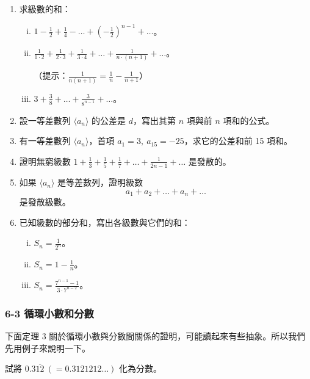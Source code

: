 \begin{enumerate}
    \item 求級數的和：
    \begin{enumerate}[(i)]
        \item $1 - \frac{1}{2} + \frac{1}{4} - \dots + (-\frac{1}{2})^{n-1} + \dots$。
        \item $\frac{1}{1\cdot 2} + \frac{1}{2\cdot 3} + \frac{1}{3\cdot 4} + \dots + \frac{1}{n\cdot(n+1)} + \dots$。
        
        （提示：$\frac{1}{n(n+1)} = \frac{1}{n} - \frac{1}{n+1}$）
        \item $3 + \frac{3}{8} + \dots + \frac{3}{8^{n-1}} + \dots$。
    \end{enumerate}

    \item 設一等差數列 $\langle a_n \rangle$ 的公差是 $d$，寫出其第 $n$ 項與前 $n$ 項和的公式。

    \item 有一等差數列 $\langle a_n \rangle$，首項 $a_1=3,\ a_{15}=-25$，求它的公差和前 15 項和。

    \item 證明無窮級數 $1 + \frac{1}{3} + \frac{1}{5} + \frac{1}{7} + \dots + \frac{1}{2n-1} + \dots$ 是發散的。

    \item 如果 $\langle a_n \rangle$ 是等差數列，證明級數
    \[
    a_1+a_2+\dots+a_n+\dots
    \]
    是發散級數。

    \item 已知級數的部分和，寫出各級數與它們的和：
    \begin{enumerate}[(i)]
        \item $S_n = \frac{1}{2^n}$。
        \item $S_n = 1 - \frac{1}{n}$。
        \item $S_n = \frac{7^{n-1}-1}{3\cdot 7^{n-2}}$。
    \end{enumerate}
\end{enumerate}

\subsubsection*{6-3 循環小數和分數}

下面定理 3 關於循環小數與分數間關係的證明，可能讀起來有些抽象。所以我們先用例子來說明一下。

\begin{example}\label{ex:b2_2-6-2}
試將 $0.3\overline{12}\ (=0.3121212\dots)$ 化為分數。
\end{example}
